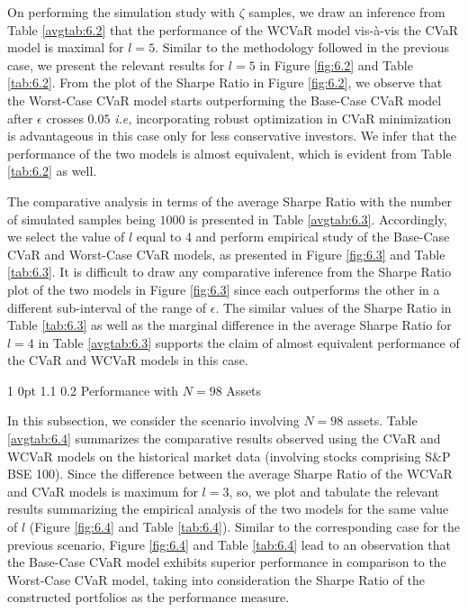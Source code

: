 \documentclass[12pt]{article}
\makeatletter
\numberwithin{equation}{section}
\renewcommand{\subsubsection}{
  \@startsection
  {subsubsection}%
  {1}%
  {0pt}%
  {1.1\baselineskip}%
  {0.2\baselineskip}%
  {\sc \centering}%
}
\makeatother
\begin{document}
On performing the simulation study with $\zeta$ samples, we draw an inference from Table \ref{avgtab:6.2} that the performance of the WCVaR model vis-\`a-vis the CVaR model is maximal for $l=5$. Similar to the methodology followed in the previous case, we present the relevant results for $l=5$ in Figure \ref{fig:6.2} and Table \ref{tab:6.2}. From the plot of the Sharpe Ratio in Figure \ref{fig:6.2}, we observe that the Worst-Case CVaR model starts outperforming the Base-Case CVaR model after $\epsilon$ crosses $0.05$ \textit{i.e,} incorporating robust optimization in CVaR minimization is advantageous in this case only for less conservative investors. We infer that the performance of the two models is almost equivalent, which is evident from Table \ref{tab:6.2} as well.

The comparative analysis in terms of the average Sharpe Ratio with the number of simulated samples being $1000$ is presented in Table \ref{avgtab:6.3}. Accordingly, we select the value of $l$ equal to 4 and perform empirical study of the Base-Case CVaR and Worst-Case CVaR models, as presented in Figure \ref{fig:6.3} and Table \ref{tab:6.3}. It is difficult to draw any comparative inference from the Sharpe Ratio plot of the two models in Figure \ref{fig:6.3} since each outperforms the other in a different sub-interval of the range of $\epsilon$. The similar values of the Sharpe Ratio in Table \ref{tab:6.3} as well as the marginal difference in the average Sharpe Ratio for $l=4$ in Table \ref{avgtab:6.3} supports the claim of almost equivalent performance of the CVaR and WCVaR models in this case.



\subsubsection{Performance with $N=98$ Assets}

In this subsection, we consider the scenario involving $N=98$ assets. Table \ref{avgtab:6.4} summarizes the comparative results observed using the CVaR and WCVaR models on the historical market data (involving stocks comprising S\&P BSE 100). Since the difference between the average Sharpe Ratio of the WCVaR and CVaR models is maximum for $l=3$, so, we plot and tabulate the relevant results summarizing the empirical analysis of the two models for the same value of $l$ (Figure \ref{fig:6.4} and Table \ref{tab:6.4}). Similar to the corresponding case for the previous scenario, Figure \ref{fig:6.4} and Table \ref{tab:6.4} lead to an observation that the Base-Case CVaR model exhibits superior performance in comparison to the Worst-Case CVaR model, taking into consideration the Sharpe Ratio of the constructed portfolios as the performance measure. 
\end{document}
